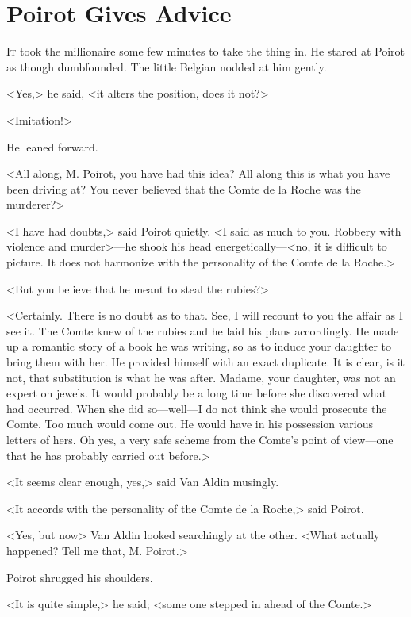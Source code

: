 \chapter{Poirot Gives Advice}



\lettrine{I}{t} took the millionaire some few minutes to take the thing in. He stared at Poirot as though dumbfounded. The little Belgian nodded at him gently.

\zz
<Yes,> he said, <it alters the position, does it not?>

<Imitation!>

He leaned forward.

<All along, M. Poirot, you have had this idea? All along this is what you have been driving at? You never believed that the Comte de la Roche was the murderer?>

<I have had doubts,> said Poirot quietly. <I said as much to you. Robbery with violence and murder>—he shook his head energetically—<no, it is difficult to picture. It does not harmonize with the personality of the Comte de la Roche.>

<But you believe that he meant to steal the rubies?>

<Certainly. There is no doubt as to that. See, I will recount to you the affair as I see it. The Comte knew of the rubies and he laid his plans accordingly. He made up a romantic story of a book he was writing, so as to induce your daughter to bring them with her. He provided himself with an exact duplicate. It is clear, is it not, that substitution is what he was after. Madame, your daughter, was not an expert on jewels. It would probably be a long time before she discovered what had occurred. When she did so—well—I do not think she would prosecute the Comte. Too much would come out. He would have in his possession various letters of hers. Oh yes, a very safe scheme from the Comte's point of view—one that he has probably carried out before.>

<It seems clear enough, yes,> said Van Aldin musingly.

<It accords with the personality of the Comte de la Roche,> said Poirot.

<Yes, but now\longdash> Van Aldin looked searchingly at the other. <What actually happened? Tell me that, M. Poirot.>

Poirot shrugged his shoulders.

<It is quite simple,> he said; <some one stepped in ahead of the Comte.>

